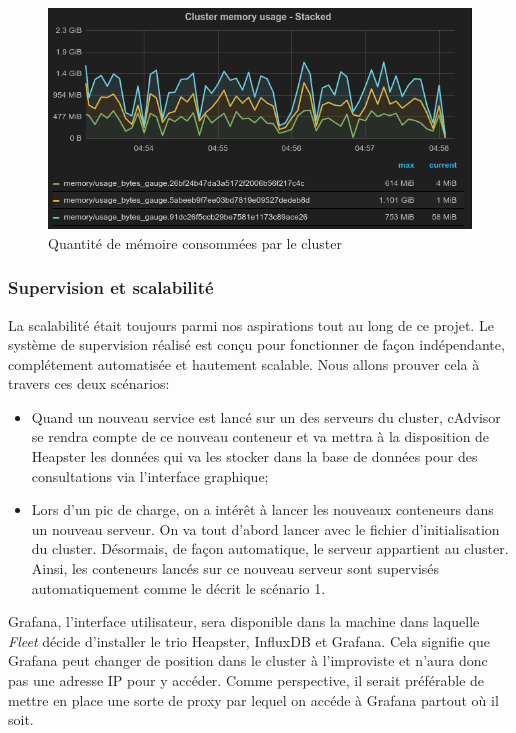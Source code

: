 \begin{onehalfspace}
\begin{figure}[H]
\centering
\includegraphics [scale=0.6]{chapitre4/assets/cluster-memory}
\caption{Quantité de mémoire consommées par le cluster}
\label{fig:}
\end{figure}


\subsubsection{Supervision et scalabilité}

La scalabilité était toujours parmi nos aspirations tout au long de ce projet. Le système de supervision réalisé est conçu pour fonctionner de façon indépendante, complétement automatisée et hautement scalable. Nous allons prouver cela à travers ces deux scénarios:

\begin{itemize}
	\item Quand un nouveau service est lancé sur un des serveurs du cluster, cAdvisor se rendra compte de ce nouveau conteneur et va mettra à la disposition de Heapster les données qui va les stocker dans la base de données pour des consultations via l'interface graphique;
	\item Lors d'un pic de charge, on a intérêt à lancer les nouveaux conteneurs dans un nouveau serveur. On va tout d'abord lancer avec le fichier d'initialisation du cluster. Désormais, de façon automatique, le serveur appartient au cluster. Ainsi, les conteneurs lancés sur ce nouveau serveur sont supervisés automatiquement comme le décrit le scénario 1.
\end{itemize}

Grafana, l'interface utilisateur, sera disponible dans la machine dans laquelle \emph{Fleet} décide d'installer le trio Heapster, InfluxDB et Grafana. Cela signifie que Grafana peut changer de position dans le cluster à l'improviste et n'aura donc pas une adresse IP pour y accéder. Comme perspective, il serait préférable de mettre en place une sorte de proxy par lequel on accéde à Grafana partout où il soit.


\end{onehalfspace}
